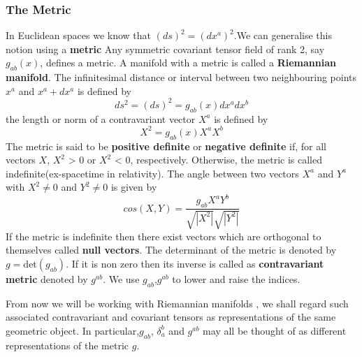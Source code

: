 \documentclass[12pt,a4paper]{article}
\numberwithin{table}{section}
\numberwithin{figure}{section}
\numberwithin{equation}{section}
\theoremstyle{remark}
\theoremstyle{definition}
\begin{document}
\subsubsection*{The Metric}
In Euclidean spaces we know that $(ds)^2=(dx^a)^2$.We can generalise this notion using a \textbf{metric} Any symmetric covariant tensor field of rank 2, say $g_{ab}(x)$, defines a metric. A manifold with a metric is called a \textbf{Riemannian manifold}. The infinitesimal distance or interval between two  neighbouring points $x^a$ and $x^a + dx^a$ is defined by
$$ds^2=(ds)^2=g_{ab}(x)dx^adx^b $$
the length or norm of a contravariant vector $X^a$ is defined by
$$X^2=g_{ab}(x)X^aX^b $$
The metric is said to be \textbf{positive definite} or \textbf{negative definite} if, for all vectors 
$X$, $X^2$ > 0 or $X^2$ < 0, respectively. Otherwise, the metric is called indefinite(ex-spacetime in relativity).
The angle between two vectors $X^a$ and $Y^a$ with $X^2\neq0$ and $Y^2\neq0$ is given by 
$$cos(X,Y)=\dfrac{g_{ab}X^aY^b}{\sqrt{|X^2|}\sqrt{|Y^2|}} $$
If the metric is indefinite then there exist vectors which are orthogonal to themselves called \textbf{null vectors}.
The determinant of the metric is denoted by $g=\text{det}(g_{ab})$.
If it is non zero then its inverse is called as \textbf{contravariant metric} denoted by $g^{ab}$. We use $g_{ab}$,$g^{ab}$ to lower and raise the indices.

From now we will be working with Riemannian manifolds , we shall regard such 
associated contravariant and covariant tensors as representations of the 
same geometric object. In particular,$g_{ab}$, $\delta^b_a$ and $g^{ab}$ may all be thought of as different representations of the metric $g$.
\end{document}
